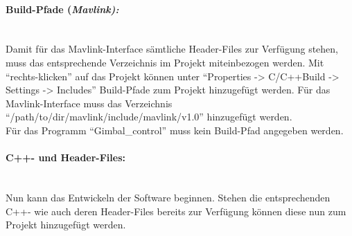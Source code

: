 \documentclass[12pt]{article} %
\begin{document}
	\paragraph*{Build-Pfade (\em Mavlink):}\ \\
	Damit für das Mavlink-Interface sämtliche Header-Files zur Verfügung stehen, muss das entsprechende Verzeichnis im Projekt miteinbezogen werden. Mit "`rechts-klicken"' auf das Projekt können unter "`Properties -> C/C++Build -> Settings -> Includes"' Build-Pfade  zum Projekt hinzugefügt werden. Für das Mavlink-Interface muss das Verzeichnis \\"`/path/to/dir/mavlink/include/mavlink/v1.0"' hinzugefügt werden.
	\\[0.2cm]
	Für das Programm "`Gimbal\_control"' muss kein Build-Pfad angegeben werden.
		
	\paragraph*{C++- und Header-Files:}\ \\
	Nun kann das Entwickeln der Software beginnen. Stehen die entsprechenden C++- wie auch deren Header-Files bereits zur Verfügung können diese nun zum Projekt hinzugefügt werden.
		
\end{document}
